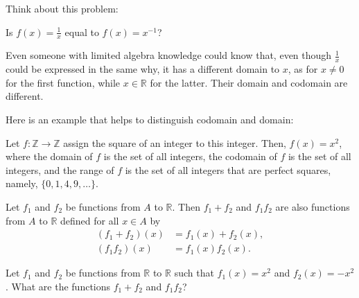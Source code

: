 Think about this problem:
\begin{problem}
    Is $f(x) = \frac{1}{x}$ equal to $f(x) = x^{-1} $?
\end{problem}
\begin{solution}
Even someone with limited algebra knowledge could know that, even though $\frac{1} {x}$ could be expressed in the same why, it has a different domain to $x$, as for $x \neq 0$ for the first function, while $x\in \mathbb{R}$ for the latter. Their domain and codomain are different.
\end{solution}

Here is an example that helps to distinguish codomain and domain:
\begin{example}
    Let \( f: \mathbb{Z} \rightarrow \mathbb{Z} \) assign the square of an integer to this integer. Then, \( f(x) = x^2 \), where the domain of \( f \) is the set of all integers, the codomain of \( f \) is the set of all integers, and the range of \( f \) is the set of all integers that are perfect squares, namely, \( \{0, 1, 4, 9, \ldots \} \).
\end{example}

\begin{theorem}
Let \( f_1 \) and \( f_2 \) be functions from \( A \) to \( \mathbb{R} \). Then \( f_1 + f_2 \) and \( f_1f_2 \) are also functions from \( A \) to \( \mathbb{R} \) defined for all \( x \in A \) by
\begin{align*}
    (f_1 + f_2)(x) &= f_1(x) + f_2(x), \\
    (f_1f_2)(x) &= f_1(x)f_2(x).
\end{align*}
\end{theorem}
\begin{problem}
    Let \( f_1 \) and \( f_2 \) be functions from \( \mathbb{R} \) to \( \mathbb{R} \) such that \( f_1(x) = x^2 \) and \( f_2(x) = -x^2 \). What are the functions \( f_1 + f_2 \) and \( f_1f_2 \)?
\end{problem}

